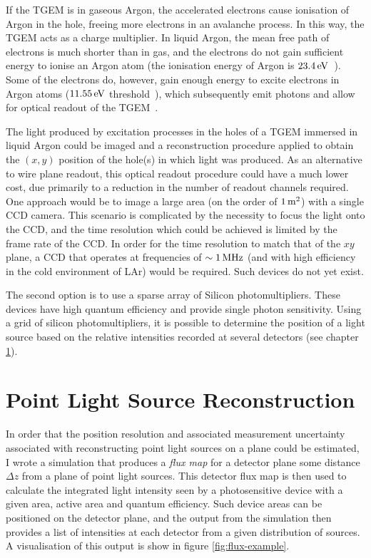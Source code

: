 If the \ac{TGEM} is in gaseous Argon, the accelerated electrons cause ionisation of Argon in the hole, freeing more electrons in an avalanche process. In this way, the \ac{TGEM} acts as a charge multiplier. In liquid Argon, the mean free path of electrons is much shorter than in gas, and the electrons do not gain sufficient energy to ionise an Argon atom (the ionisation energy of Argon is $23.4\eV$~\citep{Aprile2006}). Some of the electrons do, however, gain enough energy to excite electrons in Argon atoms ($11.55\eV$ threshold~\citep{Stewart2010}), which subsequently emit photons and allow for optical readout of the \ac{TGEM}~\citep{Lightfoot2009}.

The light produced by excitation processes in the holes of a \ac{TGEM} immersed in liquid Argon could be imaged and a reconstruction procedure applied to obtain the $(x,y)$ position of the hole(s) in which light was produced. As an alternative to wire plane readout, this optical readout procedure could have a much lower cost, due primarily to a reduction in the number of readout channels required. One approach would be to image a large area (on the order of $1 \metre^2$) with a single \ac{CCD} camera. This scenario is complicated by the necessity to focus the light onto the \ac{CCD}, and the time resolution which could be achieved is limited by the frame rate of the \ac{CCD}. In order for the time resolution to match that of the $xy$ plane, a \ac{CCD} that operates at frequencies of $\sim 1\MHz$ (and with high efficiency in the cold environment of \ac{LAr}) would be required. Such devices do not yet exist.

The second option is to use a sparse array of Silicon photomultipliers. These devices have high quantum efficiency and provide single photon sensitivity. Using a grid of silicon photomultipliers, it is possible to determine the position of a light source based on the relative intensities recorded at several detectors (see chapter \ref{sec:point-source-recon}).

\section{Point Light Source Reconstruction}\label{sec:point-source-recon}
In order that the position resolution and associated measurement uncertainty associated with reconstructing point light sources on a plane could be estimated, I wrote a simulation that produces a \emph{flux map} for a detector plane some distance $\Delta z$ from a plane of point light sources. This detector flux map is then used to calculate the integrated light intensity seen by a photosensitive device with a given area, active area and quantum efficiency. Such device areas can be positioned on the detector plane, and the output from the simulation then provides a list of intensities at each detector from a given distribution of sources. A visualisation of this output is show in figure \ref{fig:flux-example}.

